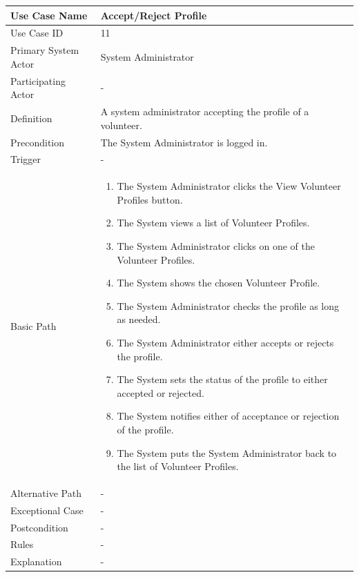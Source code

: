 \documentclass[a4paper,12pt]{report}
\begin{document}
		\begin{tabular}{|m{4cm}|m{11.5cm}|}
			\hline
				Use Case Name & Accept/Reject Profile\\
			\hline
				Use Case ID & 11\\
			\hline
				Primary System Actor & System Administrator\\
			\hline
				Participating Actor & -\\
			\hline
				Definition & A system administrator accepting the profile of a volunteer.\\
			\hline
				Precondition & The System Administrator is logged in.\\
			\hline
				Trigger & -\\
			\hline
				Basic Path & \begin{enumerate}
					\item The System Administrator clicks the View Volunteer Profiles button.
					\item The System views a list of Volunteer Profiles.
					\item The System Administrator clicks on one of the Volunteer Profiles.
					\item The System shows the chosen Volunteer Profile.
					\item The System Administrator checks the profile as long as needed.
					\item The System Administrator either accepts or rejects the profile.
					\item The System sets the status of the profile to either accepted or rejected.
					\item The System notifies either of acceptance or rejection of the profile.
					\item The System puts the System Administrator back to the list of Volunteer Profiles.
				\end{enumerate}		
				\\
			\hline
				Alternative Path & -\\
			\hline
				Exceptional Case & -\\
			\hline
				Postcondition & -\\
			\hline
				Rules & -\\
			\hline
				Explanation & -\\
			\hline
		\end{tabular}
\end{document}
